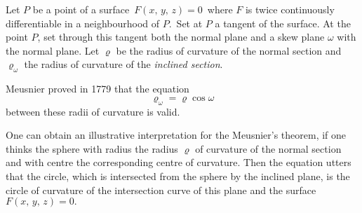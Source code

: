 \documentclass[12pt]{article}
\theoremstyle{definition}
\begin{document}
Let $P$ be a point of a surface \,$F(x,\,y,\,z) = 0$\, where $F$ is twice continuously differentiable in a neighbourhood of $P$.\, Set at $P$ a tangent of the surface.  At the point $P$, set through this tangent both the normal plane and a skew plane  $\omega$ with the normal plane.  Let $\varrho$ be the radius of curvature of the normal section and $\varrho_\omega$ the radius of curvature of the {\em inclined section}.

Meusnier proved in 1779 that the equation
$$\varrho_\omega = \varrho\cos\omega$$
between these radii of curvature is valid.

One can obtain an illustrative interpretation for the Meusnier's theorem, if one thinks the sphere with radius the radius $\varrho$ of curvature of the normal section and with centre the corresponding centre of  curvature.  Then the equation utters that the circle, which is intersected from the sphere by the inclined plane, is the circle of curvature of  the intersection curve of this plane and the surface\, $F(x,\,y,\,z) = 0.$
\end{document}
